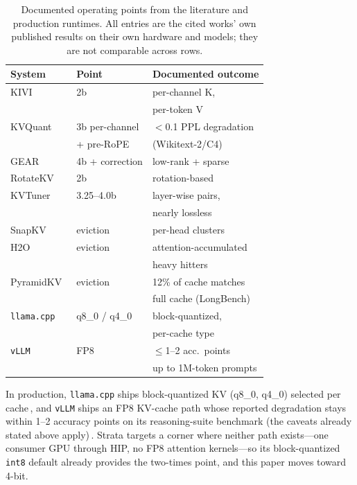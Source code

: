 \documentclass[10pt,twocolumn]{article}
\begin{document}
\begin{table}[t]
\centering
\small
\begin{tabular}{@{}lll@{}}
\toprule
\textbf{System} & \textbf{Point} & \textbf{Documented outcome} \\
\midrule
KIVI~\cite{kivi} & 2b & per-channel K,\\
& & per-token V \\
KVQuant~\cite{kvquant} & 3b per-channel & $<$0.1 PPL degradation \\
& + pre-RoPE & (Wikitext-2/C4) \\
GEAR~\cite{gear} & 4b + correction & low-rank + sparse \\
RotateKV~\cite{rotatekv} & 2b & rotation-based \\
KVTuner~\cite{kvtuner} & 3.25--4.0b & layer-wise pairs, \\
& & nearly lossless \\
SnapKV~\cite{snapkv} & eviction & per-head clusters \\
H2O~\cite{h2o} & eviction & attention-accumulated \\
& & heavy hitters \\
PyramidKV~\cite{pyramidkv} & eviction & 12\% of cache matches \\
& & full cache (LongBench) \\
\texttt{llama.cpp}~\cite{llama-cpp} & q8\_0 / q4\_0 & block-quantized, \\
& & per-cache type \\
\texttt{vLLM}~\cite{vllm-fp8} & FP8 & $\leq$1--2 acc.\ points \\
& & up to 1M-token prompts \\
\bottomrule
\end{tabular}
\caption{Documented operating points from the literature and production
runtimes. All entries are the cited works' own published results on their
own hardware and models; they are not comparable across rows.}
\label{tab:survey}
\end{table}

In production, \texttt{llama.cpp} ships block-quantized KV (q8\_0, q4\_0) selected per cache\,\cite{llama-cpp}, and \texttt{vLLM} ships an FP8 KV-cache path whose reported degradation stays within 1--2 accuracy points on its reasoning-suite benchmark (the caveats already stated above apply)\,\cite{vllm-fp8}. Strata targets a corner where neither path exists---one consumer GPU through HIP, no FP8 attention kernels---so its block-quantized \texttt{int8} default already provides the two-times point, and this paper moves toward 4-bit.
\end{document}
